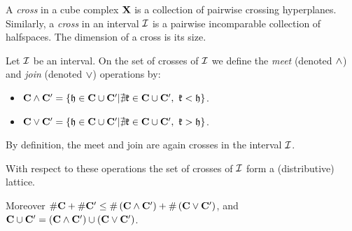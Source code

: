	A \emph{cross} in a cube complex $\mathbf{X}$ is a collection of pairwise crossing hyperplanes.
	Similarly, a \emph{cross} in an interval $\mathcal{I}$ is a pairwise incomparable collection of halfspaces.
	The dimension of a cross is its size.

	Let $\mathcal{I}$ be an interval. On the set of crosses of $\mathcal{I}$ we define the \emph{meet} (denoted $\wedge$) and  \emph{join} (denoted $\vee$) operations by:
	\begin{itemize}
		\item $\mathbf{C} \wedge \mathbf{C'} = \left\{ \mathfrak{h} \in \mathbf{C} \cup \mathbf{C}' | \nexists \mathfrak{k} \in \mathbf{C} \cup \mathbf{C}',~ \mathfrak{k} < \mathfrak{h} \right\}$.
		\item $\mathbf{C} \vee \mathbf{C'} = \left\{ \mathfrak{h} \in \mathbf{C} \cup \mathbf{C}' |\nexists \mathfrak{k} \in \mathbf{C} \cup \mathbf{C}',~ \mathfrak{k} > \mathfrak{h} \right\}$.
	\end{itemize}


By definition, the meet and join are again crosses in the interval $\mathcal{I}$.

\begin{observation}
	With respect to these operations the set of crosses of $\mathcal{I}$ form a (distributive) lattice.
	
	Moreover $\#\mathbf{C}+ \#\mathbf{C'} \leq \#\left(\mathbf{C} \wedge \mathbf{C'}\right) + \#\left( \mathbf{C} \vee \mathbf{C'}\right)$, and  $\mathbf{C}\cup \mathbf{C'} = \left(\mathbf{C} \wedge \mathbf{C'}\right) \cup \left( \mathbf{C} \vee \mathbf{C'}\right)$.
	
\end{observation}
